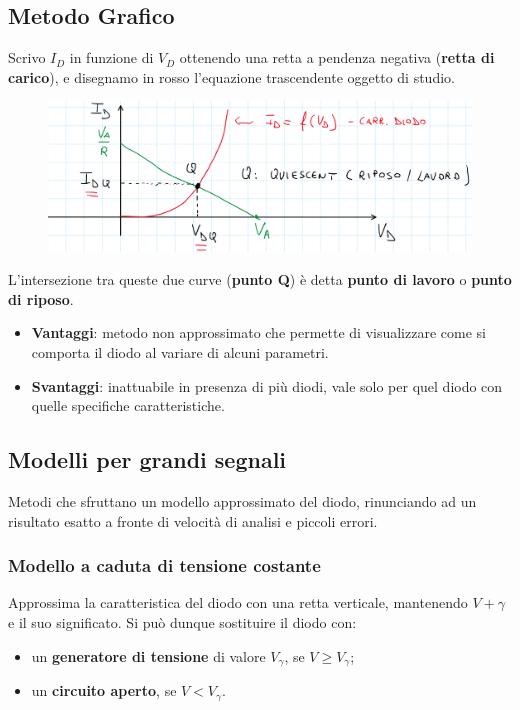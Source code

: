 \documentclass[11pt,a4paper,]{article}
\begin{document}
\subsection{Metodo Grafico}
Scrivo $I_D$ in funzione di $V_D$ ottenendo una retta a pendenza negativa (\textbf{retta di carico}), e disegnamo in rosso l'equazione trascendente oggetto di studio.
\begin{figure}[H]
    \centering
    \includegraphics[width=0.5\linewidth]{img/metodo grafico.png}
\end{figure}
L'intersezione tra queste due curve (\textbf{punto Q}) è detta \textbf{punto di lavoro} o \textbf{punto di riposo}.

\begin{itemize}
    \item \textbf{Vantaggi}: metodo non approssimato che permette di visualizzare come si comporta il diodo al variare di alcuni parametri.
    \item \textbf{Svantaggi}: inattuabile in presenza di più diodi, vale solo per quel diodo con quelle specifiche caratteristiche.
\end{itemize}
\subsection{Modelli per grandi segnali}
Metodi che sfruttano un modello approssimato del diodo, rinunciando ad un risultato esatto a fronte di velocità di analisi e piccoli errori.
\subsubsection{Modello a caduta di tensione costante}
Approssima la caratteristica del diodo con una retta verticale, mantenendo $V+\gamma$ e il suo significato. Si può dunque sostituire il diodo con:
\begin{itemize}
    \item un \textbf{generatore di tensione} di valore $V_\gamma$, se $V \geq V_\gamma$;
    \item un \textbf{circuito aperto}, se $V < V_\gamma$.
\end{itemize}
\end{document}
